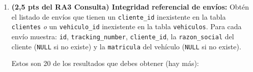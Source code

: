 \documentclass[a4paper,11pt]{article}
\begin{document}
\begin{Form}
\begin{enumerate}[leftmargin=*, label=\textbf{Pregunta \arabic*:}]
    Resuelve las siguientes cuestiones:
    \begin{itemize}
        \item (2.5 puntos del RA3) Consulta: Obtén el listado de envíos con datos normalizados que habrá que insertar en la tabla \texttt{envios\_normalizados}.
        \item (2.5 puntos del RA4) Modifica: Crea la tabla \texttt{envios\_normalizados} e inserta los envíos obtenidos en la consulta anterior. Al finalizar, elimina la tabla con \texttt{DROP TABLE} para no bloquear el Ejercicio~5. 

        \textbf{Nota:} \texttt{CREATE TABLE} Y  \texttt{DROP TABLE} son instrucciones DDL y provoca un \emph{commit} implícito; no puede deshacerse con \texttt{ROLLBACK}.
    \end{itemize}

    
    \item \textbf{(2,5 pts del RA3 Consulta) Integridad referencial de envíos:}
    Obtén el listado de envíos que tienen un \texttt{cliente\_id} inexistente en la tabla \texttt{clientes} \emph{o} un \texttt{vehiculo\_id} inexistente en la tabla \texttt{vehiculos}.
    Para cada envío muestra: \texttt{id}, \texttt{tracking\_number}, \texttt{cliente\_id}, la \texttt{razon\_social} del cliente (\texttt{NULL} si no existe) y la \texttt{matricula} del vehículo (\texttt{NULL} si no existe).

    Estos son 20 de los resultados que debes obtener (hay más):


\end{enumerate}
\end{Form}
\end{document}
